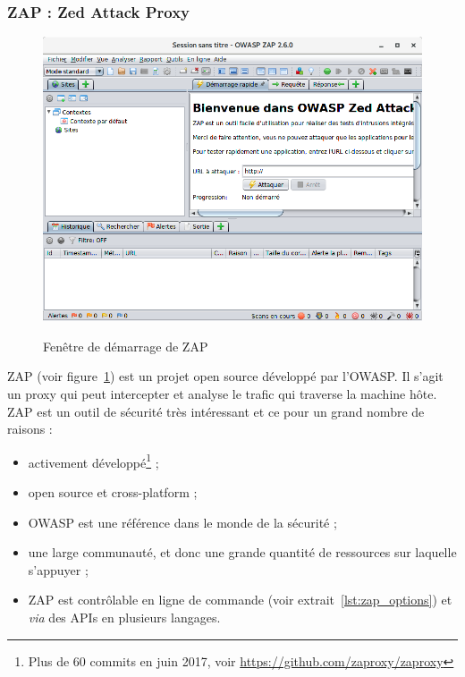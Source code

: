 \subsubsection{ZAP : Zed Attack Proxy}
\begin{figure}
	{\includegraphics[width=\textwidth]{images/zap_acceuil}}
	\centering
	\caption{Fenêtre de démarrage de ZAP}
	\label{fig:zap_acceuil}
\end{figure}
ZAP\cite{zap} (voir figure~\ref{fig:zap_acceuil}) est un projet open source développé par l'OWASP\cite{owasp}. Il s'agit un proxy qui peut intercepter et analyse le trafic qui traverse la machine hôte. ZAP est un outil de sécurité très intéressant et ce pour un grand nombre de raisons :
\begin{itemize}[label=$\bullet$]
	\item activement développé\footnote{Plus de 60 commits en juin 2017, voir \url{https://github.com/zaproxy/zaproxy}} ;
	\item open source et cross-platform ;
	\item OWASP est une référence dans le monde de la sécurité ;
	\item une large communauté, et donc une grande quantité de ressources sur laquelle s'appuyer ;
	\item ZAP est contrôlable en ligne de commande (voir extrait~\ref{lst:zap_options}) et \textit{via} des APIs en plusieurs langages.
\end{itemize}

